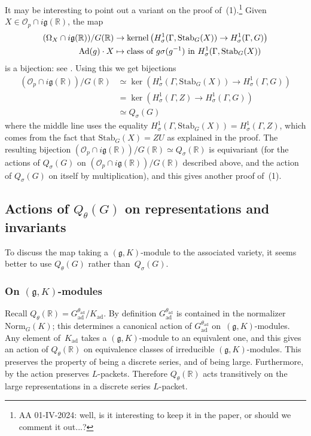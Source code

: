 \documentclass[10pt,leqno]{article}
\newcommand{\kernel}{\mathrm{kernel}}
\newcommand{\ad}{\mathrm{ad}}
\newcommand{\Gad}{G_\mathrm{ad}}
\newcommand{\Kad}{K_\mathrm{ad}}
\newcommand{\Stab}{\mathrm{Stab}}
\renewcommand{\O}{\mathcal O}
\newcommand{\R}{\mathbb R}
\newcommand{\g}{\mathfrak g}
\newcommand{\Op}{\O_p}
\begin{document}
It may be interesting to point out a variant on the proof of~(1).\footnote{AA 01-IV-2024: well, is it interesting to keep it in the paper, or should we comment it out...? } Given $X \in \Op \cap i\g(\R)$, the map 
\begin{align} \label{bij_q_2} (\Omega_{X} \cap i\g(\R))/G(\R) & \to \kernel\left(H^1_\sigma(\Gamma,\mathrm{Stab}_G(X))\rightarrow H^1_\sigma(\Gamma,G)\right) \\ \mathrm{Ad}(g) \cdot X & \mapsto \text{class of $ g\sigma(g^{-1})$ in $H^1_\sigma(\Gamma,\mathrm{Stab}_G(X))$} \nonumber \end{align} 
is a bijection: see \cite[Lemma 5.2]{galois}. 
Using this we get bijections
$$
\begin{aligned}
(\Op\cap i\g(\R))/G(\R)&\simeq \ker(H^1_\sigma(\Gamma,\Stab_G(X))\rightarrow H^1_\sigma(\Gamma,G))\\
&=
\ker(H^1_\sigma(\Gamma,Z)\rightarrow H^1_\sigma(\Gamma,G))\\
&\simeq Q_{\sigma}(G)
\end{aligned}
$$
where the middle line uses the equality $H^1_\sigma(\Gamma,\Stab_G(X))=H^1_\sigma(\Gamma,Z)$, which comes from the fact that $\Stab_G(X)=ZU$  as explained in the proof. The resulting bijection  $(\Op\cap i\g(\R))/G(\R)\simeq Q_\sigma(\R)$ is equivariant (for the actions of $Q_\sigma(G)$ on $(\Op\cap i\g(\R))/G(\R)$ described above, and the action of  $Q_\sigma(G)$ on itself by multiplication), and this gives another proof of~(1). 

\subsection{Actions of $Q_\theta(G)$ on representations and invariants}

To discuss the map taking a $(\g, K)$-module to the associated variety, it seems better to use $Q_{\theta}(G)$ rather than~$Q_{\sigma}(G)$. 


 \subsubsection*{On $(\g, K)$-modules} 
 
 Recall $Q_{\theta}(\R)=\Gad^{\theta_{\ad}}/\Kad$. By definition $\Gad^{\theta_{\ad}}$ is contained in the normalizer $\mathrm{Norm}_G(K)$; this determines a canonical action of $\Gad^{\theta_{\ad}}$ on~$(\g, K)$-modules.
 Any element of~$\Kad$ takes a $(\g,K)$-module to an equivalent one, and this gives an action of $Q_{\theta}(\R)$ on equivalence classes of irreducible $(\g, K)$-modules.
 This preserves the property of being a discrete series, and of being large.
 Furthermore, by \cite[Lemma 6.18 and Remark 6.19]{Contragredient} the action preserves $L$-packets.
 Therefore $Q_{\theta}(\R)$ acts transitively on the large representations in a discrete series $L$-packet.
  
\end{document}
